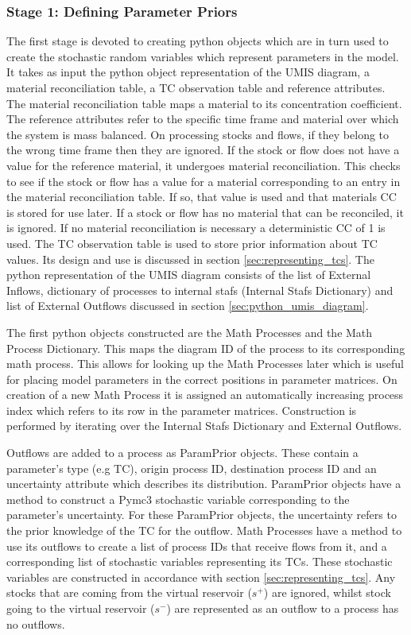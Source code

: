 \documentclass[ %
                    author={Tom Jager},
                supervisor={Dr. Daniel Schien},
                    degree={MEng},
                     title={A Bayesian Inference Engine for UMIS Structured Data},
                  subtitle={},
                      type={research},
                      year={2019} ]{dissertation}
\begin{document}
\subsubsection{Stage 1: Defining Parameter Priors}
The first stage is devoted to creating python objects which are in turn used to create the stochastic random variables which represent parameters in the model. It takes as input the python object representation of the UMIS diagram, a material reconciliation table, a TC observation table and reference attributes. The material reconciliation table maps a material to its concentration coefficient. The reference attributes refer to the specific time frame and material over which the system is mass balanced. On processing stocks and flows, if they belong to the wrong time frame then they are ignored. If the stock or flow does not have a value for the reference material, it undergoes material reconciliation. This checks to see if the stock or flow has a value for a material corresponding to an entry in the material reconciliation table. If so, that value is used and that materials CC is stored for use later. If a stock or flow has no material that can be reconciled, it is ignored. If no material reconciliation is necessary a deterministic CC of 1 is used. The TC observation table is used to store prior information about TC values. Its design and use is discussed in section \ref{sec:representing_tcs}. The python representation of the UMIS diagram consists of the list of External Inflows, dictionary of processes to internal stafs (Internal Stafs Dictionary) and list of External Outflows discussed in section \ref{sec:python_umis_diagram}.

The first python objects constructed are the Math Processes and the Math Process Dictionary. This maps the diagram ID of the process to its corresponding math process. This allows for looking up the Math Processes later which is useful for placing model parameters in the correct positions in parameter matrices. On creation of a new Math Process it is assigned an automatically increasing process index which refers to its row in the parameter matrices. Construction is performed by iterating over the Internal Stafs Dictionary and External Outflows.

Outflows are added to a process as ParamPrior objects. These contain a parameter's type (e.g TC), origin process ID, destination process ID and an uncertainty attribute which describes its distribution. ParamPrior objects have a method to construct a Pymc3 stochastic variable corresponding to the parameter's uncertainty. For these ParamPrior objects, the uncertainty refers to the prior knowledge of the TC for the outflow. Math Processes have a method to use its outflows to create a list of process IDs that receive flows from it, and a corresponding list of stochastic variables representing its TCs. These stochastic variables are constructed in accordance with section \ref{sec:representing_tcs}. Any stocks that are coming from the virtual reservoir ($s^+$) are ignored, whilst stock going to the virtual reservoir ($s^-$) are represented as an outflow to a process has no outflows.
\end{document}
